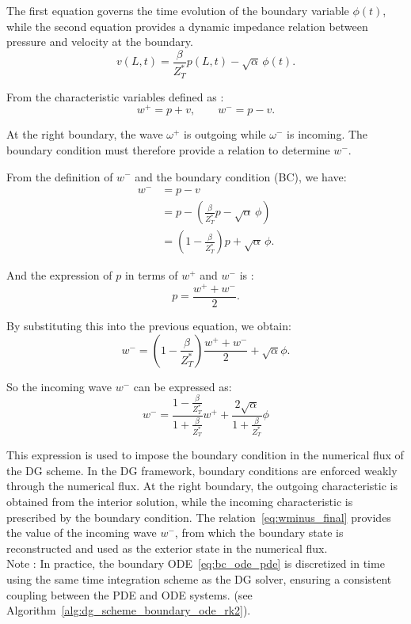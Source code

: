\documentclass[11pt,a4paper]{report}
\theoremstyle{plain}
\theoremstyle{definition}
\begin{document}
The first equation governs the time evolution of the boundary variable $\phi(t)$, while the second
equation provides a dynamic impedance relation between pressure and velocity at the boundary.
\begin{equation}
v(L,t) = \frac{\beta}{Z^\ast_T} p(L,t) - \sqrt{\alpha}\,\phi(t).
\tag{BC}
\end{equation}

From the characteristic variables defined as :
\begin{equation}
w^+ = p + v,
\qquad
w^- = p - v.
\end{equation}

At the right boundary, the wave $\omega^+$ is outgoing while $\omega^-$ is incoming.
The boundary condition must therefore provide a relation to determine $w^-$.

From the definition of $w^-$ and the boundary condition (BC), we have:
\begin{equation}
    \begin{aligned}
        w^-
        &= p - v \\
        &= p - \left( \frac{\beta}{Z^\ast_T} p - \sqrt{\alpha}\,\phi \right) \\
        &= \left(1 - \frac{\beta}{Z^\ast_T}\right)p + \sqrt{\alpha}\,\phi.
    \end{aligned}
\end{equation}

And the expression of $p$ in terms of $w^+$ and $w
^-$ is :
\begin{equation}
p = \frac{w^+ + w^-}{2}.
\end{equation}

By substituting this into the previous equation, we obtain:
\begin{equation}
w^-
= \left(1 - \frac{\beta}{Z^\ast_T}\right)\frac{w^+ + w^-}{2} + \sqrt{\alpha} \phi.
\end{equation}

So the incoming wave $w^-$ can be expressed as:
\begin{equation}
\boxed{
w^- =
\frac{1 - \frac{\beta}{Z^\ast_T}}{1 + \frac{\beta}{Z^\ast_T}}
w^+
+
\frac{2\sqrt{\alpha}}{1 + \frac{\beta}{Z^\ast_T}} \phi
}
\label{eq:wminus_final}
\end{equation}

This expression is used to impose the boundary condition in the numerical flux of the DG scheme.
In the DG framework, boundary conditions are enforced weakly through the numerical flux.
At the right boundary, the outgoing characteristic is obtained from the interior solution,
while the incoming characteristic is prescribed by the boundary condition.
The relation~\eqref{eq:wminus_final} provides the value of the incoming wave $w^-$, from which
the boundary state is reconstructed and used as the exterior state in the numerical flux.
\\
Note : In practice, the boundary ODE~\eqref{eq:bc_ode_pde} is discretized in time using the same time
integration scheme as the DG solver, ensuring a consistent coupling between the PDE and ODE systems. (see Algorithm~\ref{alg:dg_scheme_boundary_ode_rk2}).
\end{document}

